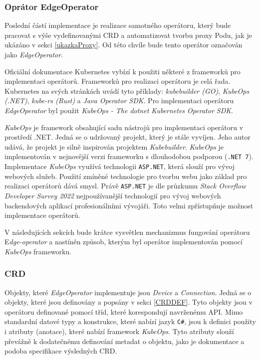 \subsubsection{Oprátor EdgeOperator}\label{oper}
Poslední částí implementace je realizace samotného operátoru, který bude pracovat s výše vydefinovanými CRD a automatizovat tvorbu proxy Podu, jak je ukázáno v sekci \ref{ukazkaProxy}. Od této chvíle bude tento operátor označován jako \textit{EdgeOperator}.

Oficiální dokumentace Kubernetes vybízí k použiti některé z frameworků pro implementaci operátorů. Frameworků pro realizaci operátoru je celá řada. Kubernetes na svých stránkách uvádí tyto příklady: \textit{kubebuilder (GO)}, \textit{KubeOps (.NET)}, \textit{kube-rs (Rust)} a \textit{Java Operator SDK}. Pro implementaci operátoru \textit{EdgeOperator} byl použit \textit{KubeOps - The dotnet Kubernetes Operator SDK}. \cite{bhler_2023_kubeops}

\textit{KubeOps} je framework obsahující sadu nástrojů pro implementaci operátoru v prostředí .NET. Jedná se o udržovaný projekt, který je stále vyvíjen. Jeho autor udává, že projekt je silně inspirován projektem \textit{Kubebuilder}. \cite{bhler_2023_kubeops} \textit{KubeOps} je implementován v nejnovější verzi frameworku s dlouhodobou podporou (\verb|.NET 7|). Implementace \textit{KubeOps} využívá technologii \verb|ASP.NET|, která slouží pro vývoj webových služeb. Použití zmíněné technologie pro tvorbu webu jako základ pro realizaci operátorů dává smysl. Právě \verb|ASP.NET| je dle průzkumu \textit{Stack Overflow Developer Survey 2022} nejpoužívanější technologií pro vývoj webových backendových aplikací profesionálními vývojáři. \cite{stackoverflow_2023_2022} Toto velmi zpřístupňuje možnost implementace operátorů.

V následujících sekcích bude krátce vysvětlen mechanizmus fungování operátoru E\textit{dge-operator} a nastíněn způsob, kterým byl operátor implementován pomocí \textit{KubeOps} frameworku. 

\subsubsection*{CRD}
Objekty, které \textit{EdgeOperator} implementuje jsou \textit{Device} a \textit{Connection}. Jedná se o objekty, které jsou definovány a popsány v sekci \ref{CRDDEF}. Tyto objekty jsou v operátoru definované pomocí tříd, které korespondují navrženému API. Mimo standardní datové typy a konstrukce, které nabízí jazyk \verb|C#|, jsou k definici použity i atributy (anotace), které nabízí framework \textit{KubeOps}. Tyto atributy slouží převážně k dodatečnému definování metadat o objektu, jako je dokumentace a podoba specifikace výsledných CRD.


